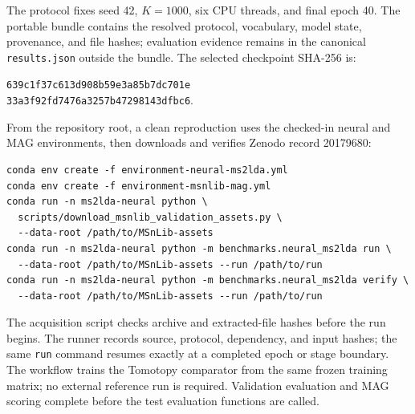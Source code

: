 \documentclass[10pt,a4paper]{article}
\begin{document}
The protocol fixes seed 42, $K=1000$, six CPU threads, and final epoch 40. The
portable bundle contains the resolved protocol, vocabulary, model state,
provenance, and file hashes; evaluation evidence remains in the canonical
\texttt{results.json} outside the bundle. The selected checkpoint SHA-256 is:
\begin{center}
\small\texttt{639c1f37c613d908b59e3a85b7dc701e}\\[-2pt]
\texttt{33a3f92fd7476a3257b47298143dfbc6}.
\end{center}
From the repository root, a clean reproduction uses the checked-in neural and
MAG environments, then downloads and verifies Zenodo record 20179680:
\begin{verbatim}
conda env create -f environment-neural-ms2lda.yml
conda env create -f environment-msnlib-mag.yml
conda run -n ms2lda-neural python \
  scripts/download_msnlib_validation_assets.py \
  --data-root /path/to/MSnLib-assets
conda run -n ms2lda-neural python -m benchmarks.neural_ms2lda run \
  --data-root /path/to/MSnLib-assets --run /path/to/run
conda run -n ms2lda-neural python -m benchmarks.neural_ms2lda verify \
  --data-root /path/to/MSnLib-assets --run /path/to/run
\end{verbatim}
The acquisition script checks archive and extracted-file hashes before the run
begins. The runner records source, protocol, dependency, and input hashes; the
same \texttt{run} command resumes exactly at a completed epoch or stage
boundary.
The workflow trains the Tomotopy comparator from the same frozen training
matrix; no external reference run is required. Validation evaluation and MAG
scoring complete before the test evaluation functions are called.
\end{document}

